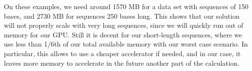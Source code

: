On these examples, we need around 1570 MB for a data set with sequences of 150 bases, and 2730 MB for sequences 250 bases long. This shows that our solution will not properly scale with very long sequences, since we will quickly run out of memory for our GPU. Still it is decent for our short-length sequences, where we use less than 1/6th of our total available memory with our worst case scenario. In particular, this allows to use a cheaper accelerator if needed, and in our case, it leaves more memory to accelerate in the future another part of the calculation.
